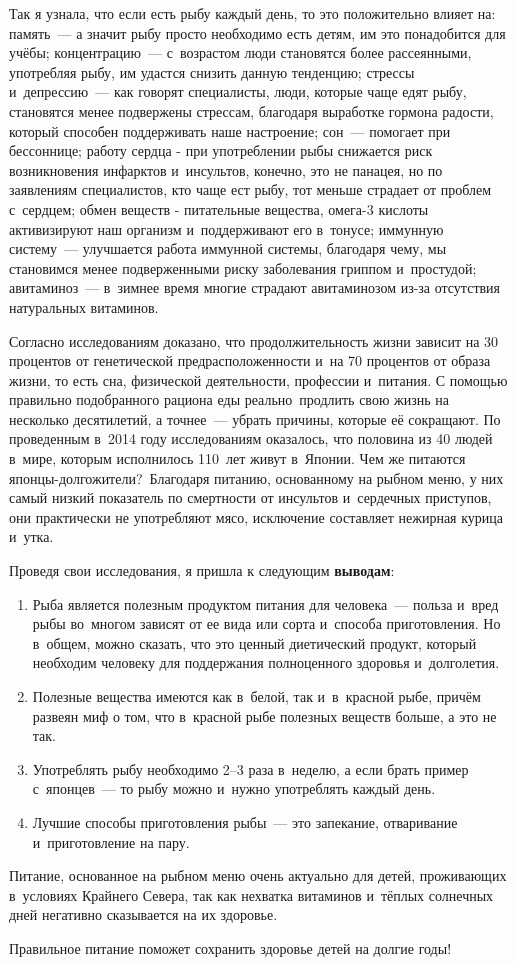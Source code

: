 Так я узнала, что если есть рыбу каждый день, то это положительно влияет на: память~--- а значит рыбу просто необходимо есть детям, им это понадобится для учёбы; концентрацию~---  с~возрастом люди становятся более рассеянными, употребляя рыбу, им удастся снизить данную тенденцию; стрессы и~депрессию~--- как говорят специалисты, люди, которые чаще едят рыбу, становятся менее подвержены стрессам, благодаря выработке гормона радости, который способен поддерживать наше настроение; сон~--- помогает при бессоннице; работу сердца - при употреблении рыбы снижается риск возникновения инфарктов и~инсультов, конечно, это не панацея, но по заявлениям специалистов, кто чаще ест рыбу, тот меньше страдает от проблем с~сердцем; обмен веществ - питательные вещества, омега-3 кислоты активизируют наш организм и~поддерживают его в~тонусе; иммунную систему~--- улучшается работа иммунной системы, благодаря чему, мы становимся менее подверженными риску заболевания гриппом и~простудой; авитаминоз~--- в~зимнее время многие страдают авитаминозом из-за отсутствия натуральных витаминов.

Согласно исследованиям доказано, что продолжительность жизни зависит на 30 процентов от генетической предрасположенности и~на 70 процентов от образа жизни, то есть сна, физической деятельности, профессии и~питания. С помощью правильно подобранного рациона еды реально продлить свою жизнь на несколько десятилетий, а точнее~--- убрать причины, которые её сокращают. По проведенным в~2014 году исследованиям оказалось, что половина из 40 людей в~мире, которым исполнилось 110~лет живут в~Японии. Чем же питаются японцы-долгожители? Благодаря питанию, основанному на рыбном меню, у них самый низкий показатель по смертности от инсультов и~сердечных приступов, они практически не употребляют мясо, исключение составляет нежирная курица и~утка. 

Проведя свои исследования, я пришла к следующим \textbf{выводам}:
\begin{enumerate}[noitemsep]\vspace{-8pt}
\item Рыба является полезным продуктом питания для человека~--- польза и~вред рыбы во~многом зависят от ее вида или сорта и~способа приготовления. Но в~общем, можно сказать, что это ценный диетический продукт, который необходим человеку для поддержания полноценного здоровья и~долголетия.
\item Полезные вещества имеются как в~белой, так и~в~красной рыбе,  причём развеян миф о том, что в~красной рыбе полезных веществ больше, а это не так.
\item Употреблять рыбу необходимо 2--3 раза в~неделю, а если брать пример с~японцев~--- то рыбу можно и~нужно употреблять каждый день.
\item Лучшие способы приготовления рыбы~--- это запекание, отваривание и~приготовление на пару.
\end{enumerate}\vspace{-8pt}

Питание, основанное на рыбном меню очень актуально для детей, проживающих в~условиях Крайнего Севера, так как нехватка витаминов и~тёплых солнечных дней негативно сказывается на их здоровье.

Правильное питание поможет сохранить здоровье детей на долгие годы!
